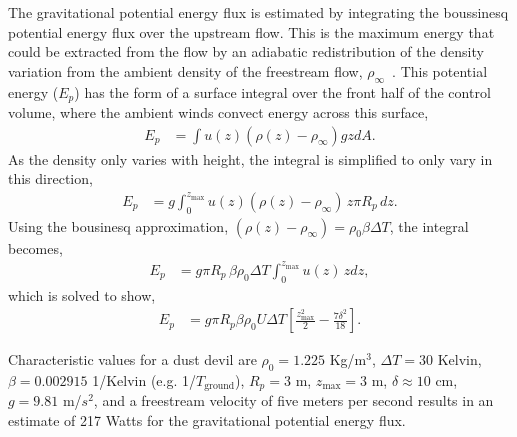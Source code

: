 The gravitational potential energy flux is estimated by integrating the
boussinesq potential energy flux over the upstream flow. 
This is the maximum energy that could be extracted from the flow by an 
adiabatic redistribution of the density variation from the ambient 
density of the freestream flow,
$\rho_\infty$~\cite{hatsopoulos1965principles}. This potential energy  
($E_p$) has the form of a surface integral over the front half of the
control volume, where the ambient winds convect energy across this surface,
\begin{align*}
  E_p & = \int u(z) (\rho(z)-\rho_\infty) g z dA. 
\end{align*}
As the density only varies with height, the integral is simplified to
only vary in this direction,
\begin{align*}
  E_p  & = g \int^{z_\text{max}}_0 u(z) (\rho(z)-\rho_\infty) \, z  \pi
 R_p \, dz.
\end{align*}
Using the bousinesq approximation, $(\rho(z)-\rho_\infty)  = \rho_0 \beta \Delta T$,
the integral becomes, 
\begin{align*}
  E_p & = g  \pi R_p \, \beta \rho_0 \Delta T \int^{z_\text{max}}_0 u(z) \, z dz,
\end{align*}
which is solved to show,
\begin{align}
  E_p & = g  \pi R_p \beta \rho_0 U \Delta T \left[ \frac{z_\text{max}^2}{2} - \frac{7 \delta^2}{18} \right].\label{eq:potential}
\end{align}

%
% 
%
%
%

Characteristic values for a dust devil are $\rho_0 = 1.225$ Kg/$\text{m}^3$, 
$\Delta T= 30$ Kelvin, $\beta = 0.002915$ 1/Kelvin (e.g. 1/$T_{\text{ground}}$), 
$R_p = 3 $ m, $z_\text{max} = 3$ m, $\delta \approx 10$ cm, $g=9.81$
m/$s^2$, and a freestream velocity of five meters per second results in
an estimate of 217 Watts for the gravitational potential energy
flux.

